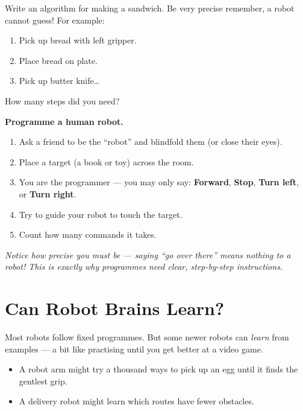\sectionrule

\begin{tryit}
  Write an algorithm for making a sandwich. Be very precise \textemdash{}
  remember, a robot cannot guess! For example:
  \begin{enumerate}
    \item Pick up bread with left gripper.
    \item Place bread on plate.
    \item Pick up butter knife\ldots
  \end{enumerate}
  How many steps did you need?
\end{tryit}

\sectionrule



\begin{experiment}
  \textbf{Programme a human robot.}
  \begin{enumerate}
    \item Ask a friend to be the ``robot'' and blindfold them (or close their eyes).
    \item Place a target (a book or toy) across the room.
    \item You are the programmer --- you may only say: \textbf{Forward},
      \textbf{Stop}, \textbf{Turn left}, or \textbf{Turn right}.
    \item Try to guide your robot to touch the target.
    \item Count how many commands it takes.
  \end{enumerate}
  \textit{Notice how precise you must be --- saying ``go over there''
  means nothing to a robot! This is exactly why programmes need
  clear, step-by-step instructions.}
\end{experiment}

\sectionrule

\section*{Can Robot Brains Learn?}

Most robots follow fixed programmes. But some newer robots can \emph{learn}
from examples --- a bit like practising until you get better at a video game.

\begin{itemize}
  \item A robot arm might try a thousand ways to pick up an egg until it
    finds the gentlest grip.
  \item A delivery robot might learn which routes have fewer obstacles.
\end{itemize}

